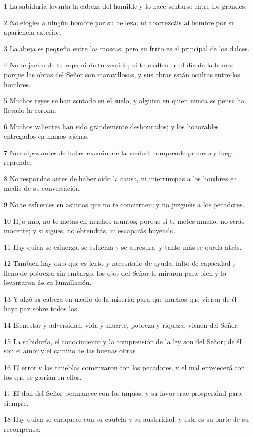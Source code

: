 \par 1 La sabiduría levanta la cabeza del humilde y lo hace sentarse entre los grandes.
\par 2 No elogies a ningún hombre por su belleza; ni aborrezcáis al hombre por su apariencia exterior.
\par 3 La abeja es pequeña entre las moscas; pero su fruto es el principal de los dulces.
\par 4 No te jactes de tu ropa ni de tu vestido, ni te exaltes en el día de la honra; porque las obras del Señor son maravillosas, y sus obras están ocultas entre los hombres.
\par 5 Muchos reyes se han sentado en el suelo; y alguien en quien nunca se pensó ha llevado la corona.
\par 6 Muchos valientes han sido grandemente deshonrados; y los honorables entregados en manos ajenas.
\par 7 No culpes antes de haber examinado la verdad: comprende primero y luego reprende.
\par 8 No respondas antes de haber oído la causa, ni interrumpas a los hombres en medio de su conversación.
\par 9 No te esfuerces en asuntos que no te conciernen; y no juzguéis a los pecadores.
\par 10 Hijo mío, no te metas en muchos asuntos; porque si te metes mucho, no serás inocente; y si sigues, no obtendrás, ni escaparás huyendo.
\par 11 Hay quien se esfuerza, se esfuerza y ​​se apresura, y tanto más se queda atrás.
\par 12 También hay otro que es lento y necesitado de ayuda, falto de capacidad y lleno de pobreza; sin embargo, los ojos del Señor lo miraron para bien y lo levantaron de su humillación.
\par 13 Y alzó su cabeza en medio de la miseria; para que muchos que vieron de él haya paz sobre todos los
\par 14 Bienestar y adversidad, vida y muerte, pobreza y riqueza, vienen del Señor.
\par 15 La sabiduría, el conocimiento y la comprensión de la ley son del Señor; de él son el amor y el camino de las buenas obras.
\par 16 El error y las tinieblas comenzaron con los pecadores, y el mal envejecerá con los que se glorían en ellos.
\par 17 El don del Señor permanece con los impíos, y su favor trae prosperidad para siempre.
\par 18 Hay quien se enriquece con su cautela y su austeridad, y esta es su parte de su recompensa:
